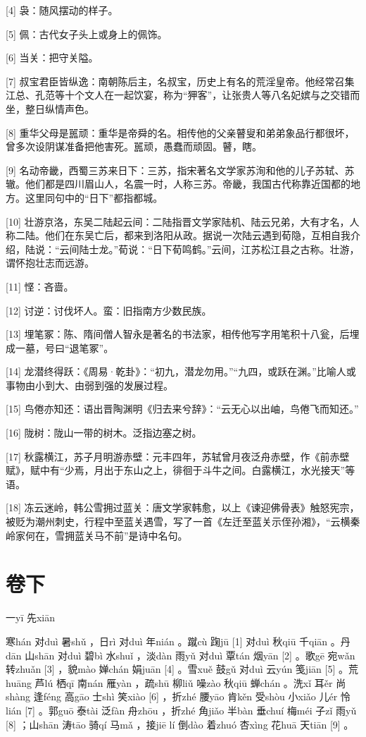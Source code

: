 \documentclass[12pt,UTF8]{ctexbook}
\begin{document}
[4] 袅：随风摆动的样子。

[5] 佩：古代女子头上或身上的佩饰。

[6] 当关：把守关隘。

[7] 叔宝君臣皆纵逸：南朝陈后主，名叔宝，历史上有名的荒淫皇帝。他经常召集江总、孔范等十个文人在一起饮宴，称为“狎客”，让张贵人等八名妃嫔与之交错而坐，整日纵情声色。

[8] 重华父母是嚚顽：重华是帝舜的名。相传他的父亲瞽叟和弟弟象品行都很坏，曾多次设阴谋准备把他害死。嚚顽，愚蠢而顽固。瞽，瞎。

[9] 名动帝畿，西蜀三苏来日下：三苏，指宋著名文学家苏洵和他的儿子苏轼、苏辙。他们都是四川眉山人，名震一时，人称三苏。帝畿，我国古代称靠近国都的地方。这里同句中的“日下”都指都城。

[10] 壮游京洛，东吴二陆起云间：二陆指晋文学家陆机、陆云兄弟，大有才名，人称二陆。他们在东吴亡后，都来到洛阳从政。据说一次陆云遇到荀隐，互相自我介绍，陆说：“云间陆士龙。”荀说：“日下荀鸣鹤。”云间，江苏松江县之古称。壮游，谓怀抱壮志而远游。

[11] 悭：吝啬。

[12] 讨逆：讨伐坏人。蛮：旧指南方少数民族。

[13] 埋笔冢：陈、隋间僧人智永是著名的书法家，相传他写字用笔积十八瓮，后埋成一墓，号曰“退笔冢”。

[14] 龙潜终得跃：《周易·乾卦》：“初九，潜龙勿用。”“九四，或跃在渊。”比喻人或事物由小到大、由弱到强的发展过程。

[15] 鸟倦亦知还：语出晋陶渊明《归去来兮辞》：“云无心以出岫，鸟倦飞而知还。”

[16] 陇树：陇山一带的树木。泛指边塞之树。

[17] 秋露横江，苏子月明游赤壁：元丰四年，苏轼曾月夜泛舟赤壁，作《前赤壁赋》，赋中有“少焉，月出于东山之上，徘徊于斗牛之间。白露横江，水光接天”等语。

[18] 冻云迷岭，韩公雪拥过蓝关：唐文学家韩愈，以上《谏迎佛骨表》触怒宪宗，被贬为潮州刺史，行程中至蓝关遇雪，写了一首《左迁至蓝关示侄孙湘》，“云横秦岭家何在，雪拥蓝关马不前”是诗中名句。





\part{卷下}


一yī 先xiān


寒hán 对duì 暑shǔ ，日rì 对duì 年nián 。蹴cù 踘jū [1] 对duì 秋qiū 千qiān 。丹dān 山shān 对duì 碧bì 水shuǐ ，淡dàn 雨yǔ 对duì 覃tán 烟yān [2] 。歌gē 宛wǎn 转zhuǎn [3] ，貌mào 婵chán 娟juān [4] 。雪xuě 鼓gǔ 对duì 云yún 笺jiān [5] 。荒huāng 芦lú 栖qī 南nán 雁yàn ，疏shū 柳liǔ 噪zào 秋qiū 蝉chán 。洗xǐ 耳ěr 尚shàng 逢féng 高gāo 士shì 笑xiào [6] ，折zhé 腰yāo 肯kěn 受shòu 小xiǎo 儿ér 怜lián [7] 。郭guō 泰tài 泛fàn 舟zhōu ，折zhé 角jiǎo 半bàn 垂chuí 梅méi 子zǐ 雨yǔ [8] ；山shān 涛tāo 骑qí 马mǎ ，接jiē lí 倒dào 着zhuó 杏xìng 花huā 天tiān [9] 。
\end{document}
